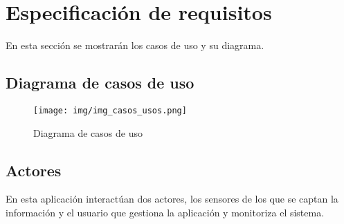 \newpage



\section{Especificación de requisitos}

En esta sección se mostrarán los casos de uso y su diagrama.

\subsection{Diagrama de casos de uso}

\begin{figure}[!h]
	\centering
	\texttt{[image: img/img\_casos\_usos.png]}
	\caption{Diagrama de casos de uso}
	\label{img_casos_usos}
\end{figure}
\clearpage

\subsection{Actores}
En esta aplicación interactúan dos actores, los sensores de los que se captan la información y el usuario que gestiona la aplicación y monitoriza el sistema.


